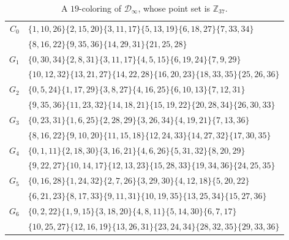 \documentclass[11pt]{amsart}
\newcommand{\Z}{\mathbb Z}
\begin{document}
\begin{table}[htb]
\caption{A $19$-coloring of $\mathcal D_{\infty}$, whose point set is $\Z_{37}$.}\label{tab:inf}
\footnotesize
\begin{tabular}{@{}r@{\;\;}l@{}}
$C_0$ & $\{1,10,26\}$\;$\{2,15,20\}$\;$\{3,11,17\}$\;$\{5,13,19\}$\;$\{6,18,27\}$\;$\{7,33,34\}$ \\
 & $\{8,16,22\}$\;$\{9,35,36\}$\;$\{14,29,31\}$\;$\{21,25,28\}$ \\
$G_1$ & $\{0,30,34\}$\;$\{2,8,31\}$\;$\{3,11,17\}$\;$\{4,5,15\}$\;$\{6,19,24\}$\;$\{7,9,29\}$ \\
 & $\{10,12,32\}$\;$\{13,21,27\}$\;$\{14,22,28\}$\;$\{16,20,23\}$\;$\{18,33,35\}$\;$\{25,26,36\}$ \\
$G_2$ & $\{0,5,24\}$\;$\{1,17,29\}$\;$\{3,8,27\}$\;$\{4,16,25\}$\;$\{6,10,13\}$\;$\{7,12,31\}$ \\
 & $\{9,35,36\}$\;$\{11,23,32\}$\;$\{14,18,21\}$\;$\{15,19,22\}$\;$\{20,28,34\}$\;$\{26,30,33\}$ \\
$G_3$ & $\{0,23,31\}$\;$\{1,6,25\}$\;$\{2,28,29\}$\;$\{3,26,34\}$\;$\{4,19,21\}$\;$\{7,13,36\}$ \\
 & $\{8,16,22\}$\;$\{9,10,20\}$\;$\{11,15,18\}$\;$\{12,24,33\}$\;$\{14,27,32\}$\;$\{17,30,35\}$ \\
$G_4$ & $\{0,1,11\}$\;$\{2,18,30\}$\;$\{3,16,21\}$\;$\{4,6,26\}$\;$\{5,31,32\}$\;$\{8,20,29\}$ \\
 & $\{9,22,27\}$\;$\{10,14,17\}$\;$\{12,13,23\}$\;$\{15,28,33\}$\;$\{19,34,36\}$\;$\{24,25,35\}$ \\
$G_5$ & $\{0,16,28\}$\;$\{1,24,32\}$\;$\{2,7,26\}$\;$\{3,29,30\}$\;$\{4,12,18\}$\;$\{5,20,22\}$ \\
 & $\{6,21,23\}$\;$\{8,17,33\}$\;$\{9,11,31\}$\;$\{10,19,35\}$\;$\{13,25,34\}$\;$\{15,27,36\}$ \\
$G_6$ & $\{0,2,22\}$\;$\{1,9,15\}$\;$\{3,18,20\}$\;$\{4,8,11\}$\;$\{5,14,30\}$\;$\{6,7,17\}$ \\
 & $\{10,25,27\}$\;$\{12,16,19\}$\;$\{13,26,31\}$\;$\{23,24,34\}$\;$\{28,32,35\}$\;$\{29,33,36\}$ \\
\end{tabular}
\end{table}
\end{document}
